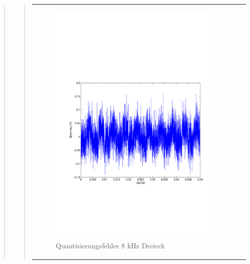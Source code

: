 \begin{quote}
\begin{quote}
\begin{center}
\begin{tabular}{ll}
                \begin{minipage}{0.6\textwidth}
                    \begin{figure}[H]
                        \includegraphics[scale=0.5, trim = 16mm 70mm 16mm 85mm, clip]
                                        {Bilder/100kHz_dreieck_Quantisierungsfehler}
                        \caption{Quantisierungsfehler 8 kHz Dreieck}
                        \label{fig:QuantErr 8 kHz Dreieck}
                    \end{figure}
                \end{minipage}
            
            \end{tabular}
        \end{center}
        
        \vspace{2em}
        

\end{quote}
\end{quote}
